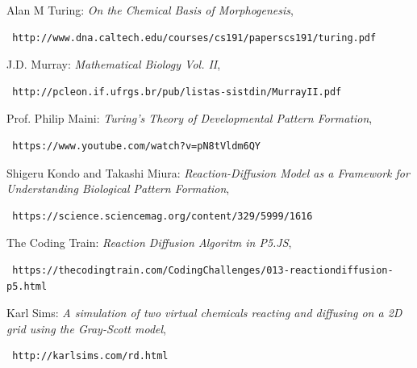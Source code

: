 \documentclass[12pt,a4paper]{amsart}
\numberwithin{equation}{section}
\theoremstyle{plain}
\theoremstyle{definition}
\begin{document}
\newpage
\begin{thebibliography}{99} 

 Alan M Turing: \textit{On the Chemical Basis of Morphogenesis}, \begin{verbatim} http://www.dna.caltech.edu/courses/cs191/paperscs191/turing.pdf
\end{verbatim}

 J.D. Murray: \textit{Mathematical Biology Vol. II}, \begin{verbatim} http://pcleon.if.ufrgs.br/pub/listas-sistdin/MurrayII.pdf
\end{verbatim}

 Prof. Philip Maini: \textit{Turing's Theory of Developmental Pattern Formation}, \begin{verbatim} https://www.youtube.com/watch?v=pN8tVldm6QY
\end{verbatim}

 Shigeru Kondo and Takashi Miura: \textit{Reaction-Diffusion Model as a Framework for Understanding Biological Pattern Formation}, \begin{verbatim} https://science.sciencemag.org/content/329/5999/1616
\end{verbatim}

 The Coding Train: \textit{Reaction Diffusion Algoritm in P5.JS}, \begin{verbatim} https://thecodingtrain.com/CodingChallenges/013-reactiondiffusion-p5.html
\end{verbatim}

 Karl Sims: \textit{A simulation of two virtual chemicals reacting and diffusing on a 2D grid using the Gray-Scott model}, \begin{verbatim} http://karlsims.com/rd.html
\end{verbatim}

\end{thebibliography}


\vspace*{\fill}
\end{document}
